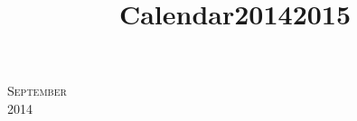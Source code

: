 \documentclass[landscape]{article}
\title{Calendar20142015}
\begin{document}
\pagestyle{empty} %

\noindent



\begin{center}
\textsc{\LARGE September}\\ %
\textsc{\large 2014} %
\end{center}

\end{document}
